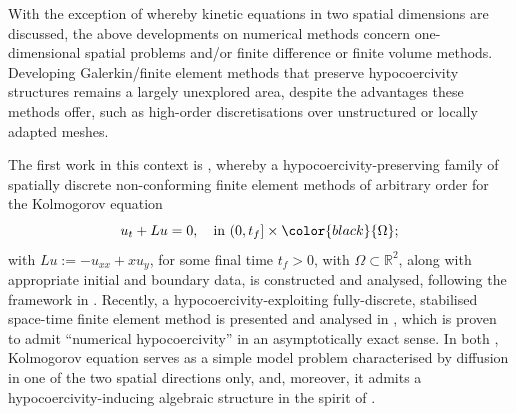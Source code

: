 \documentclass{amsart}
\newcommand{\man}[1]{{\color{black}{#1}}}
\theoremstyle{definition}
\theoremstyle{remark}
\numberwithin{equation}{section}
\begin{document}
With the exception of \cite{foster_loheac_tran} whereby kinetic equations in two spatial dimensions are discussed, the above developments on numerical methods concern one-dimensional spatial problems and/or finite difference or finite volume methods. Developing Galerkin/finite element methods that preserve hypocoercivity structures remains a largely unexplored area, despite the advantages these methods offer, such as high-order discretisations over unstructured or locally adapted meshes.

The first work in this context is \cite{georgoulis}, whereby a hypocoercivity-preserving family of spatially discrete non-conforming finite element methods of arbitrary order for the Kolmogorov equation
\begin{equation}\label{eq:kolmogorov}
 u_t+ L u = 0,\quad \text{in }(0,t_f]\times \man{\Omega};
\end{equation}
 {with $L u :=  - u_{xx}+ x u_y$}, for some final time $t_f>0$, with $\Omega\subset\mathbb{R}^2$, along with appropriate initial and boundary data, is constructed and analysed, following the framework in \cite{villani}. Recently, a hypocoercivity-exploiting fully-discrete, stabilised space-time finite element method  is presented and analysed in \cite{DonGeoHer24}, which is proven to admit ``numerical hypocoercivity'' in an asymptotically exact sense. In both \cite{georgoulis,  DonGeoHer24}, Kolmogorov equation serves as a simple model problem characterised by diffusion in one of the two spatial directions only, and, moreover, it admits a hypocoercivity-inducing algebraic structure in the spirit of  \cite{villani}.
\end{document}
